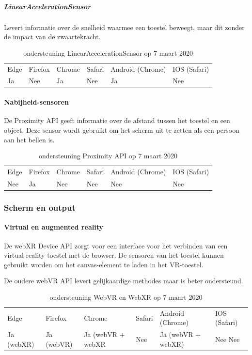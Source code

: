 			
	\subparagraph{LinearAccelerationSensor    }
		Levert informatie over de snelheid waarmee een toestel beweegt, maar dit zonder de impact van de zwaartekracht.
			
		\begin{table}[H]
			\centering
			\begin{tabular}{llllll}
				Edge & Firefox & Chrome & Safari & Android (Chrome) & IOS (Safari) \\
				Ja   & Nee      &  Ja   & Nee     & Ja               & Nee          
			\end{tabular}	
			\caption{ondersteuning 	LinearAccelerationSensor  op 7 maart 2020 }
		\end{table}
		
			
\paragraph{Nabijheid-sensoren }
De Proximity API \autocite{Kostiainen2019} geeft informatie over de afstand tussen het toestel en een object. Deze sensor wordt gebruikt om het scherm uit te zetten als een persoon aan het bellen is.

\begin{table}[H]
	\centering
	\begin{tabular}{llllll}
		Edge & Firefox & Chrome & Safari & Android (Chrome) & IOS (Safari) \\
		Nee   & Ja      &  Nee   & Nee     & Nee               & Nee          
	\end{tabular}	
	\caption{ondersteuning  Proximity API op 7 maart 2020 }
\end{table}



\subsubsection{Scherm en output}
\paragraph{Virtual en augmented reality }
De webXR Device API \autocite{Jones2019} zorgt voor een interface voor het verbinden van een virtual reality toestel met de browser. De sensoren van het toestel kunnen gebruikt worden om het canvas-element te laden in het VR-toestel.

De oudere webVR API levert gelijkaardige methodes maar is beter ondersteund.

\begin{table}[H]
	\centering
	\begin{tabular}{llllll}
		Edge & Firefox & Chrome & Safari & Android (Chrome) & IOS (Safari) \\
		Ja (webXR)  & 	Ja (webVR)  &  	Ja (webVR + webXR  & Nee  & Ja (webVR + webXR) & Nee Nee          
	\end{tabular}	
	\caption{ondersteuning  WebVR en WebXR op 7 maart 2020 }
\end{table}\

